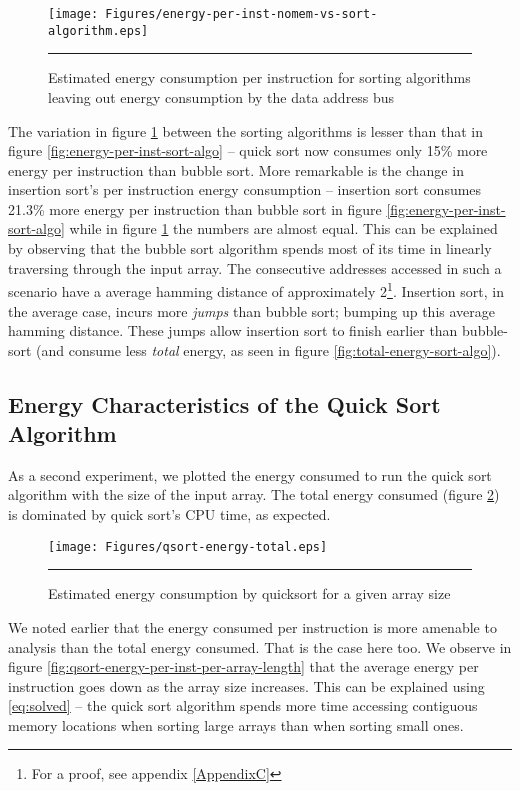 \begin{figure}[htbp]
  \centering
  \texttt{[image: Figures/energy-per-inst-nomem-vs-sort-algorithm.eps]}
  \rule{35em}{0.5pt}
  \caption{Estimated energy consumption per instruction for sorting
    algorithms leaving out energy consumption by the data address bus}
  \label{fig:energy-per-inst-nomem-sort-algo}
\end{figure}

The variation in figure \ref{fig:energy-per-inst-nomem-sort-algo}
between the sorting algorithms is lesser than that in figure
\ref{fig:energy-per-inst-sort-algo} -- quick sort now consumes only
15\% more energy per instruction than bubble sort.  More remarkable is
the change in insertion sort's per instruction energy consumption --
insertion sort consumes 21.3\% more energy per instruction than bubble
sort in figure \ref{fig:energy-per-inst-sort-algo} while in figure
\ref{fig:energy-per-inst-nomem-sort-algo} the numbers are almost
equal.  This can be explained by observing that the bubble sort
algorithm spends most of its time in linearly traversing through the
input array.  The consecutive addresses accessed in such a scenario
have a average hamming distance of approximately 2\footnote{For a
  proof, see appendix \ref{AppendixC}}.  Insertion sort, in the
average case, incurs more \textit{jumps} than bubble sort; bumping up
this average hamming distance.  These jumps allow insertion sort to
finish earlier than bubble-sort (and consume less \textit{total}
energy, as seen in figure \ref{fig:total-energy-sort-algo}).

\subsection{Energy Characteristics of the Quick Sort Algorithm}

As a second experiment, we plotted the energy consumed to run the
quick sort algorithm with the size of the input array.  The total
energy consumed (figure \ref{fig:qsort-energy-per-array-length}) is
dominated by quick sort's CPU time, as expected.

\begin{figure}[htbp]
  \centering
  \texttt{[image: Figures/qsort-energy-total.eps]}
  \rule{35em}{0.5pt}
  \caption{Estimated energy consumption by quicksort for a given array size}
  \label{fig:qsort-energy-per-array-length}
\end{figure}

We noted earlier that the energy consumed per instruction is more
amenable to analysis than the total energy consumed.  That is the case
here too.  We observe in figure
\ref{fig:qsort-energy-per-inst-per-array-length} that the average
energy per instruction goes down as the array size increases.  This
can be explained using \ref{eq:solved} -- the quick sort algorithm
spends more time accessing contiguous memory locations when sorting
large arrays than when sorting small ones.

